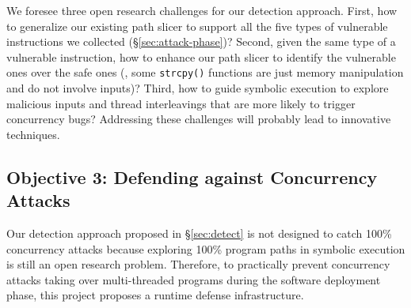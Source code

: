 



 We foresee three open research challenges for our detection 
approach. First, how to generalize our existing path slicer to support all the 
five types of vulnerable instructions we collected (\S\ref{sec:attack-phase})? 
Second, given the same type of a vulnerable instruction, how to enhance our 
path slicer to identify the vulnerable ones over the safe ones (\eg, some 
\texttt{strcpy()} functions are just memory manipulation and do not involve 
inputs)? Third, how to guide symbolic execution to explore malicious inputs and 
thread interleavings that are more likely to trigger concurrency bugs? 
Addressing these challenges will probably lead to innovative techniques.

\vspace{-.15in}\subsection{Objective 3: Defending against Concurrency 
Attacks}\label{sec:defense}\vspace{-.075in}

Our detection approach proposed in \S\ref{sec:detect} is not 
designed to catch 100\% concurrency attacks because exploring 100\% program 
paths in symbolic execution is still an open research problem. Therefore, to 
practically prevent concurrency attacks taking over multi-threaded programs 
during the software deployment phase, this project proposes a runtime defense 
infrastructure.

